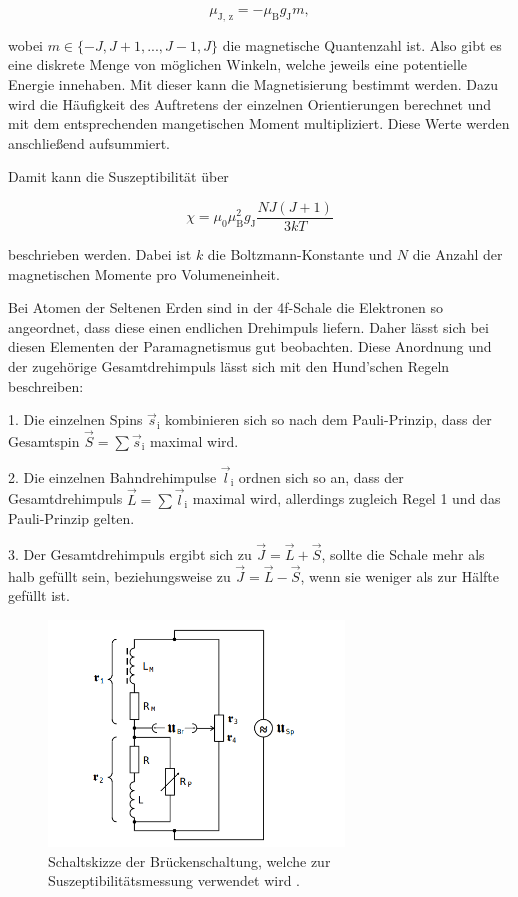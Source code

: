 \begin{equation}
    \label{eqn:mu-z}
    \mu_\text{J, z} = - \mu_\text{B} g_\text{J} m,
\end{equation}

wobei $m \in \{ -J, J+1, ... , J-1, J \}$ die magnetische Quantenzahl ist.
Also gibt es eine diskrete Menge von möglichen Winkeln, welche jeweils eine potentielle Energie innehaben.
Mit dieser kann die Magnetisierung bestimmt werden.
Dazu wird die Häufigkeit des Auftretens der einzelnen Orientierungen berechnet und mit dem entsprechenden mangetischen Moment multipliziert.
Diese Werte werden anschließend aufsummiert.

Damit kann die Suszeptibilität über

\begin{equation}
    \label{eqn:suszep}
    \chi = \mu_0 \mu_\text{B}^2 g_\text{J} \frac{N J (J + 1)}{3 k T}
\end{equation}

beschrieben werden.
Dabei ist $k$ die Boltzmann-Konstante und $N$ die Anzahl der magnetischen Momente pro Volumeneinheit.

Bei Atomen der Seltenen Erden sind in der 4f-Schale die Elektronen so angeordnet, dass diese einen endlichen Drehimpuls liefern.
Daher lässt sich bei diesen Elementen der Paramagnetismus gut beobachten.
Diese Anordnung und der zugehörige Gesamtdrehimpuls lässt sich mit den Hund'schen Regeln beschreiben:

1. Die einzelnen Spins $\vec{s}_\text{i}$ kombinieren sich so nach dem Pauli-Prinzip, dass der Gesamtspin $\vec{S} = \sum \vec{s}_\text{i}$ maximal wird.

2. Die einzelnen Bahndrehimpulse $\vec{l}_\text{i}$ ordnen sich so an, dass der Gesamtdrehimpuls $\vec{L} = \sum \vec{l}_\text{i}$ maximal wird, allerdings zugleich Regel 1 und das Pauli-Prinzip gelten.

3. Der Gesamtdrehimpuls ergibt sich zu $\vec{J} = \vec{L} + \vec{S}$, sollte die Schale mehr als halb gefüllt sein, beziehungsweise zu $\vec{J} = \vec{L} - \vec{S}$, wenn sie weniger als zur Hälfte gefüllt ist.



\begin{figure}
    \centering
    \includegraphics[width=0.70\textwidth]{content/bruecke.png}
    \caption{Schaltskizze der Brückenschaltung, welche zur Suszeptibilitätsmessung verwendet wird \cite{V606}.}
    \label{fig:bruecke}
\end{figure}

